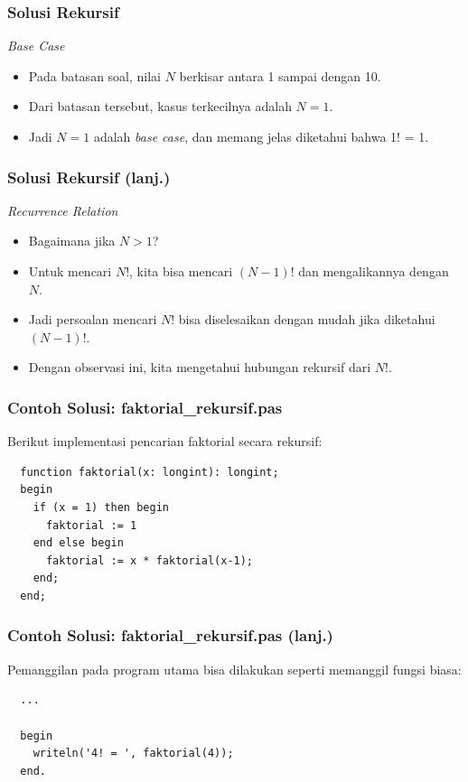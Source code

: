 \begin{frame}
\frametitle{Solusi Rekursif}
\textit{Base Case}
\begin{itemize}
  \item Pada batasan soal, nilai $N$ berkisar antara 1 sampai dengan 10.
  \item Dari batasan tersebut, kasus terkecilnya adalah $N=1$.
  \item Jadi $N=1$ adalah \textit{base case}, dan memang jelas diketahui bahwa 1! = 1.
\end{itemize}
\end{frame}

\begin{frame}
\frametitle{Solusi Rekursif (lanj.) }
\textit{Recurrence Relation}
\begin{itemize}
  \item Bagaimana jika $N > 1$?
  \item Untuk mencari $N!$, kita bisa mencari $(N-1)!$ dan mengalikannya dengan $N$.
  \item Jadi persoalan mencari $N!$ bisa diselesaikan dengan mudah jika diketahui $(N-1)!$.
  \item Dengan observasi ini, kita mengetahui hubungan rekursif dari $N!$. 
\end{itemize}
\end{frame}

\begin{frame}[fragile]
\frametitle{Contoh Solusi: faktorial\_rekursif.pas}
Berikut implementasi pencarian faktorial secara rekursif:
\begin{lstlisting}
  function faktorial(x: longint): longint;
  begin
    if (x = 1) then begin
      faktorial := 1
    end else begin
      faktorial := x * faktorial(x-1); 
    end;
  end;
\end{lstlisting}
\end{frame}

\begin{frame}[fragile]
\frametitle{Contoh Solusi: faktorial\_rekursif.pas (lanj.)}
Pemanggilan pada program utama bisa dilakukan seperti memanggil fungsi biasa:
\begin{lstlisting}
  ...
  
  begin
    writeln('4! = ', faktorial(4));
  end.
\end{lstlisting}
\end{frame}

